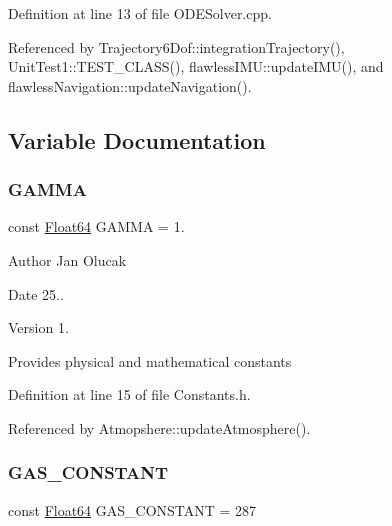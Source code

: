 Definition at line 13 of file O\+D\+E\+Solver.\+cpp.



Referenced by Trajectory6\+Dof\+::integration\+Trajectory(), Unit\+Test1\+::\+T\+E\+S\+T\+\_\+\+C\+L\+A\+S\+S(), flawless\+I\+M\+U\+::update\+I\+M\+U(), and flawless\+Navigation\+::update\+Navigation().



\subsection{Variable Documentation}
\mbox{\label{group___tools_ga6e7b8e4a71fb3f6d37718ac5d614f560}} 
\subsubsection{\texorpdfstring{G\+A\+M\+MA}{GAMMA}}
{\footnotesize\ttfamily const \hyperlink{group___tools_ga3f1431cb9f76da10f59246d1d743dc2c}{Float64} G\+A\+M\+MA = 1.}

\begin{DoxyAuthor}{Author}
Jan Olucak 
\end{DoxyAuthor}
\begin{DoxyDate}{Date}
25.. 
\end{DoxyDate}
\begin{DoxyVersion}{Version}
1.
\end{DoxyVersion}
Provides physical and mathematical constants 

Definition at line 15 of file Constants.\+h.



Referenced by Atmopshere\+::update\+Atmosphere().

\mbox{\label{group___tools_ga50141cecfc14099c41bee22b4f166637}} 
\subsubsection{\texorpdfstring{G\+A\+S\+\_\+\+C\+O\+N\+S\+T\+A\+NT}{GAS\_CONSTANT}}
{\footnotesize\ttfamily const \hyperlink{group___tools_ga3f1431cb9f76da10f59246d1d743dc2c}{Float64} G\+A\+S\+\_\+\+C\+O\+N\+S\+T\+A\+NT = 287}



